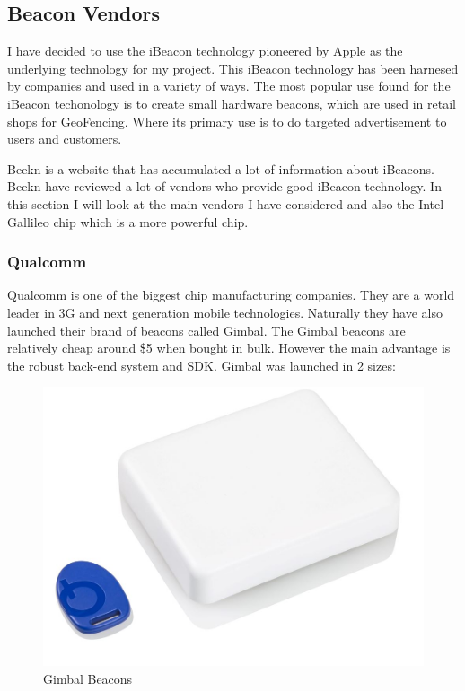 


\subsection{Beacon Vendors}

I have decided to use the iBeacon technology pioneered by Apple as
the underlying technology for my project. This iBeacon technology has been harnesed by companies and used in a variety of ways. The most popular use found for the iBeacon techonology is to create small hardware beacons, which are used in retail shops for GeoFencing. Where its primary use is to do targeted advertisement to users and customers.

Beekn\cite{beekn} is a website that has accumulated a lot of information about iBeacons. Beekn have reviewed a lot of vendors who provide good iBeacon technology. In this section I will look at the main vendors I have
considered and also the Intel Gallileo chip which is a more powerful chip.


\subsubsection{Qualcomm}

Qualcomm\cite{quallcomm} is one of the biggest chip manufacturing
companies. They are a world leader in 3G and next generation mobile
technologies. Naturally they have also launched their brand of beacons
called Gimbal\cite{gimbal}. The Gimbal beacons are relatively cheap
around \$5 when bought in bulk. However the main advantage is the
robust back-end system and SDK. Gimbal was launched in 2 sizes:

\begin{figure}[H]
\includegraphics[scale=0.3]{images/gimbal-beacon}

\protect\caption{Gimbal Beacons}
\end{figure}

